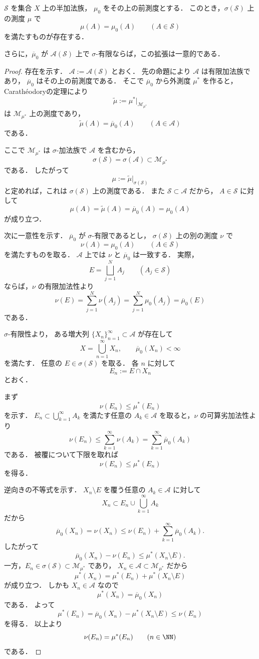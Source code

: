 \begin{theorem}
$\mathcal S$ を集合 $X$ 上の半加法族，
$\mu_0$ をその上の前測度とする．
このとき，$\sigma(\mathcal S)$ 上の測度 $\mu$ で
\[
\mu(A)=\mu_0(A)\qquad (A\in\mathcal S)
\]
を満たすものが存在する．

さらに，$\overline{\mu}_0$ が $\mathcal A(\mathcal S)$ 上で
$\sigma$-有限ならば，この拡張は一意的である．
\end{theorem}
\begin{proof}
存在を示す．
$\mathcal A:=\mathcal A(\mathcal S)$ とおく．
先の命題により $\mathcal A$ は有限加法族であり，
$\overline{\mu}_0$ はその上の前測度である．
そこで $\overline{\mu}_0$ から外測度 $\mu^*$ を作ると，
Carathéodoryの定理により
\[
\widetilde{\mu}:=\mu^*|_{\mathcal M_{\mu^*}}
\]
は $\mathcal M_{\mu^*}$ 上の測度であり，
\[
\widetilde{\mu}(A)=\overline{\mu}_0(A)
\qquad
(A\in\mathcal A)
\]
である．

ここで $\mathcal M_{\mu^*}$ は $\sigma$-加法族で
$\mathcal A$ を含むから，
\[
\sigma(\mathcal S)=\sigma(\mathcal A)\subset \mathcal M_{\mu^*}
\]
である．
したがって
\[
\mu:=\widetilde{\mu}|_{\sigma(\mathcal S)}
\]
と定めれば，これは $\sigma(\mathcal S)$ 上の測度である．
また $\mathcal S \subset \mathcal A$ だから，
$A \in \mathcal S$ に対して
\[
\mu(A)=\widetilde{\mu}(A)=\overline{\mu}_0(A)=\mu_0(A)
\]
が成り立つ．

次に一意性を示す．
$\overline{\mu}_0$ が $\sigma$-有限であるとし，
$\sigma(\mathcal S)$ 上の別の測度 $\nu$ で
\[
\nu(A)=\mu_0(A)\qquad (A\in\mathcal S)
\]
を満たすものを取る．
$\mathcal A$ 上では $\nu$ と $\overline{\mu}_0$ は一致する．
実際，
\[
E=\bigsqcup_{j=1}^N A_j
\qquad
(A_j \in \mathcal S)
\]
ならば，$\nu$ の有限加法性より
\[
\nu(E)=\sum_{j=1}^N \nu(A_j)=\sum_{j=1}^N \mu_0(A_j)=\overline{\mu}_0(E)
\]
である．

$\sigma$-有限性より，
ある増大列 $\{X_n\}_{n=1}^{\infty}\subset\mathcal A$ が存在して
\[
X=\bigcup_{n=1}^{\infty}X_n,
\qquad
\overline{\mu}_0(X_n)<\infty
\]
を満たす．
任意の $E \in \sigma(\mathcal S)$ を取る．
各 $n$ に対して
\[
E_n:=E\cap X_n
\]
とおく．

まず
\[
\nu(E_n)\le \mu^*(E_n)
\]
を示す．
$E_n \subset \bigcup_{k=1}^{\infty}A_k$ を満たす任意の
$A_k \in \mathcal A$ を取ると，$\nu$ の可算劣加法性より
\[
\nu(E_n)\le \sum_{k=1}^{\infty}\nu(A_k)
=
\sum_{k=1}^{\infty}\overline{\mu}_0(A_k)
\]
である．
被覆について下限を取れば
\[
\nu(E_n)\le \mu^*(E_n)
\]
を得る．

逆向きの不等式を示す．
$X_n \setminus E$ を覆う任意の $A_k \in \mathcal A$ に対して
\[
X_n \subset E_n \cup \bigcup_{k=1}^{\infty}A_k
\]
だから
\[
\overline{\mu}_0(X_n)=\nu(X_n)\le \nu(E_n)+\sum_{k=1}^{\infty}\overline{\mu}_0(A_k).
\]
したがって
\[
\overline{\mu}_0(X_n)-\nu(E_n)\le \mu^*(X_n \setminus E).
\]
一方，$E_n \in \sigma(\mathcal S)\subset \mathcal M_{\mu^*}$ であり，
$X_n \in \mathcal A \subset \mathcal M_{\mu^*}$ だから
\[
\mu^*(X_n)=\mu^*(E_n)+\mu^*(X_n \setminus E)
\]
が成り立つ．
しかも $X_n \in \mathcal A$ なので
\[
\mu^*(X_n)=\overline{\mu}_0(X_n)
\]
である．
よって
\[
\mu^*(E_n)=\overline{\mu}_0(X_n)-\mu^*(X_n \setminus E)\le \nu(E_n)
\]
を得る．
以上より
\[
\nu(E_n)=\mu^*(E_n)
\qquad
(n \in \NN)
\]
である．


\end{proof}
